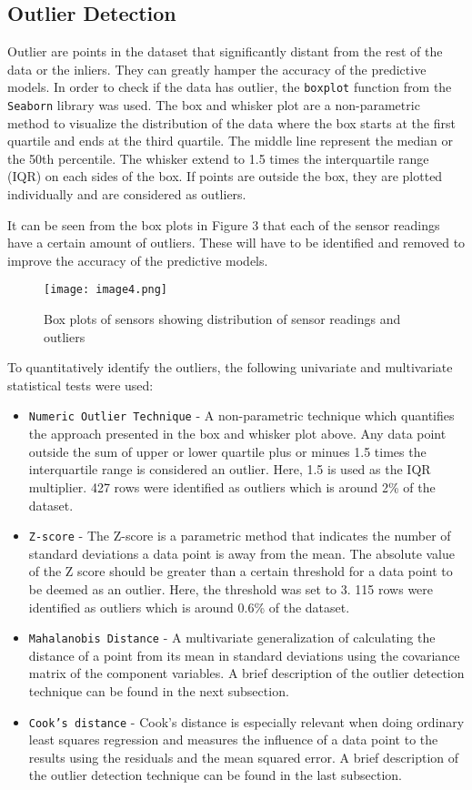 \documentclass{article}
\begin{document}
\subsection{Outlier Detection}
Outlier are points in the dataset that significantly distant from the rest of the data or the inliers.
They can greatly hamper the accuracy of the predictive models. In order to check if the data has outlier, the \texttt{boxplot} function from the \texttt{Seaborn} library was used.
The box and whisker plot are a non-parametric method to visualize the distribution of the data where the box starts at the first quartile and ends at the third quartile. The middle line represent the median or the 50th percentile.
The whisker extend to 1.5 times the interquartile range (IQR) on each sides of the box. If points are outside the box, they are plotted individually and are considered as outliers.

It can be seen from the box plots in Figure 3 that each of the sensor readings have a certain amount of outliers. These will have to be identified and removed to improve the accuracy of the predictive models.
\begin{figure}[h]
	\centering
	\texttt{[image: image4.png]}
	\caption{Box plots of sensors showing distribution of sensor readings and outliers}
\end{figure}

To quantitatively identify the outliers, the following univariate and multivariate statistical tests were used:
\begin{itemize}[topsep=0pt]
	\item \texttt{Numeric Outlier Technique} - A non-parametric technique which quantifies the approach presented in the box and whisker plot above. Any data point outside the sum of upper or lower quartile plus or minues 1.5 times the interquartile range is considered an outlier.
	      Here, 1.5 is used as the IQR multiplier. 427 rows were identified as outliers which is around 2\% of the dataset.
	\item \texttt{Z-score} - The Z-score is a parametric method that indicates the number of standard deviations a data point is away from the mean. The absolute value of the Z score should be greater than a certain threshold for a data point to be deemed as an outlier.
	      Here, the threshold was set to 3. 115 rows were identified as outliers which is around 0.6\% of the dataset.
	\item \texttt{Mahalanobis Distance} - A multivariate generalization of calculating the distance of a point from its mean in standard deviations using the covariance matrix of the component variables. A brief description of the outlier detection technique can be found in the next subsection.
	\item \texttt{Cook's distance} - Cook's distance is especially relevant when doing ordinary least squares regression and measures the influence of a data point to the results using the residuals and the mean squared error. A brief description of the outlier detection technique can be found in the last subsection.
\end{itemize}
\end{document}
